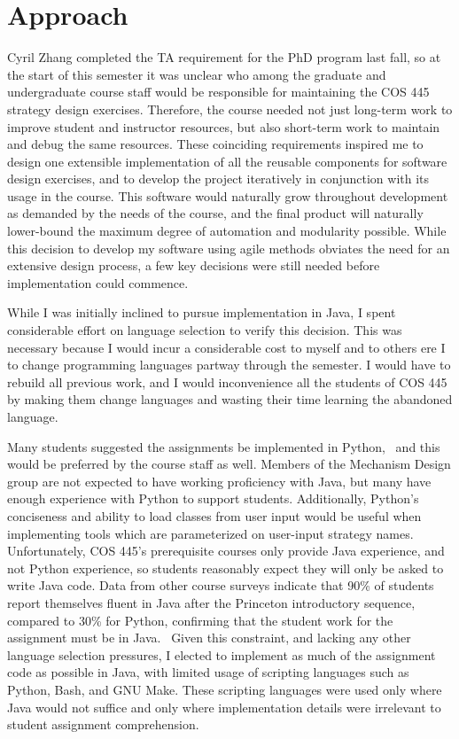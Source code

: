 \documentclass[pageno]{jpaper}
\begin{document}
\section*{Approach}
Cyril Zhang completed the TA requirement for the PhD program last fall, so at the start of this semester it was unclear who among the graduate and undergraduate course staff would be responsible for maintaining the COS 445 strategy design exercises.
Therefore, the course needed not just long-term work to improve student and instructor resources, but also short-term work to maintain and debug the same resources.
These coinciding requirements inspired me to design one extensible implementation of all the reusable components for software design exercises, and to develop the project iteratively in conjunction with its usage in the course.
This software would naturally grow throughout development as demanded by the needs of the course, and the final product will naturally lower-bound the maximum degree of automation and modularity possible.
While this decision to develop my software using agile methods obviates the need for an extensive design process, a few key decisions were still needed before implementation could commence.

While I was initially inclined to pursue implementation in Java, I spent considerable effort on language selection to verify this decision.
This was necessary because I would incur a considerable cost to myself and to others ere I to change programming languages partway through the semester.
I would have to rebuild all previous work, and I would inconvenience all the students of COS 445 by making them change languages and wasting their time learning the abandoned language.

Many students suggested the assignments be implemented in Python,~\cite{per survey 1 results} and this would be preferred by the course staff as well.
Members of the Mechanism Design group are not expected to have working proficiency with Java, but many have enough experience with Python to support students.
Additionally, Python's conciseness and ability to load classes from user input would be useful when implementing tools which are parameterized on user-input strategy names.
Unfortunately, COS 445's prerequisite courses only provide Java experience, and not Python experience, so students reasonably expect they will only be asked to write Java code.
Data from other course surveys indicate that 90\% of students report themselves fluent in Java after the Princeton introductory sequence, compared to 30\% for Python, confirming that the student work for the assignment must be in Java.~\cite{COS 333 survey data}
Given this constraint, and lacking any other language selection pressures, I elected to implement as much of the assignment code as possible in Java, with limited usage of scripting languages such as Python, Bash, and GNU Make.
These scripting languages were used only where Java would not suffice and only where implementation details were irrelevant to student assignment comprehension.
\end{document}
